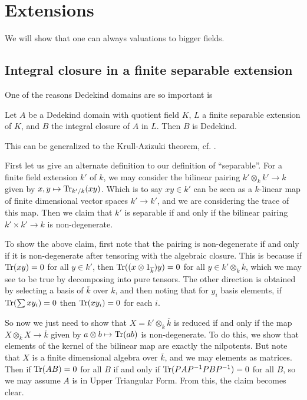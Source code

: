 \section{Extensions}

We will show that one can always   valuations to bigger fields.  
\subsection{Integral closure in a finite separable extension}

One of the reasons Dedekind domains are so important is
\begin{theorem} \label{intclosdedekind} Let $A$ be a Dedekind domain with quotient field $K$, $L$ a finite separable extension of $K$, and $B$ the integral closure of $A$ in $L$.  Then $B$ is Dedekind.
\end{theorem}

This can be generalized to the Krull-Azizuki theorem, cf. \cite{Bo68}.

First let us give an alternate definition to our definition of ``separable''.
For a finite field extension $k'$ of $k$, we may consider the bilinear pairing
$k' \otimes_k k' \to k$ given by $x,y \mapsto \operatorname{Tr}_{k'/k}(xy)$. Which is to say $xy \in k'$ can be seen as a $k$-linear map of finite dimensional vector spaces $k' \to k'$, and we are considering the trace of this map. Then we claim that $k'$ is separable if and only if the bilinear pairing $k' \times k' \to k$ is non-degenerate.

To show the above claim, first note that the pairing is non-degenerate if and
only if it is non-degenerate after tensoring with the algebraic closure. This
is because if $\operatorname{Tr}(xy)=0$ for all $y \in k'$, then $\operatorname{Tr}((x\otimes
1_{\overline{k}})y)=0$ for all $y \in k' \otimes_k \overline{k}$, which we may see to be true by decomposing into pure tensors. The other direction is obtained by selecting a basis of $\overline{k}$ over $k$, and then noting that for $y_i$ basis elements, if $\operatorname{Tr}(\sum x y_i)=0$ then $\operatorname{Tr}(xy_i)=0$ for each $i$. 

So now we just need to show that $X=k'  \otimes_k \overline{k}$ is reduced if
and only if the map $X \otimes_{\overline{k}} X \to \overline{k}$ given by $a \otimes b \mapsto \operatorname{Tr}(ab)$ is non-degenerate. To do this, we show that elements of the kernel of the bilinear map are exactly the nilpotents. But note that $X$ is a finite dimensional algebra over $\overline{k}$, and we may elements as matrices. Then if $\operatorname{Tr}(AB)=0$ for all $B$ if and only if $\operatorname{Tr}(PAP^{-1}PBP^{-1})=0$ for all $B$, so we may assume $A$ is in Upper Triangular Form. From this, the claim becomes clear.


